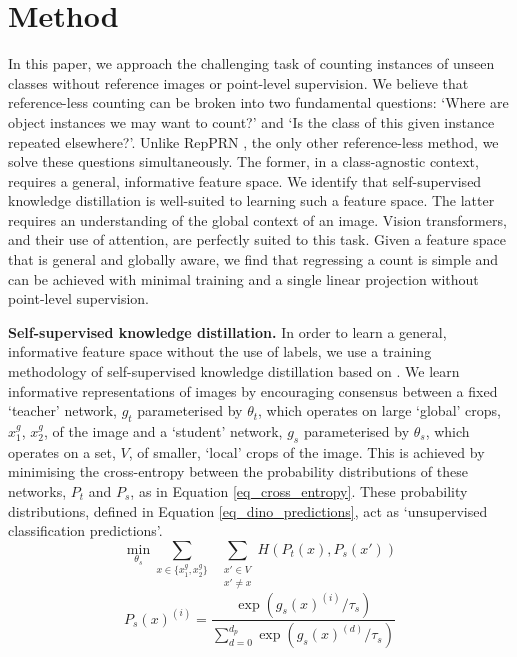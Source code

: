 \documentclass[letterpaper, 11pt]{IEEEtran}
\begin{document}
\section{Method}
\label{method}
In this paper, we approach the challenging task of counting instances of unseen classes without reference images or point-level supervision. 
We believe that reference-less counting can be broken into two fundamental questions: `Where are object instances we may want to count?' and `Is the class of this given instance repeated elsewhere?'. 
Unlike RepPRN \cite{ranjan2022exemplar}, the only other reference-less method, we solve these questions simultaneously.
The former, in a class-agnostic context, requires a general, informative feature space. We identify that self-supervised knowledge distillation is well-suited to learning such a feature space. The latter requires an understanding of the global context of an image. Vision transformers, and their use of attention, are perfectly suited to this task.
Given a feature space that is general and globally aware, we find that regressing a count is simple and can be achieved with minimal training and a single linear projection without point-level supervision.

\textbf{Self-supervised knowledge distillation.}
In order to learn a general, informative feature space without the use of labels, we use a training methodology of self-supervised knowledge distillation based on \citet{caron2021DINO}. We learn informative representations of images by encouraging consensus between a fixed `teacher' network, $g_{t}$ parameterised by $\theta_{t}$,  which operates on large `global' crops, $x_{1}^{g}$, $x_{2}^{g}$,  of the image and a `student' network, $g_{s}$ parameterised by $\theta_{s}$, which operates on a set, $V$, of smaller, `local' crops of the image.
This is achieved by minimising the cross-entropy between the probability distributions of these networks, $P_{t}$ and $P_{s}$, as in Equation \ref{eq_cross_entropy}.
These probability distributions, defined in Equation \ref{eq_dino_predictions}, act as `unsupervised classification predictions'. 
\begin{equation}
\label{eq_cross_entropy}
    \min\limits_{\theta_{s}}
    \sum_{x \in \{ x_{1}^{g}, x_{2}^{g}\}}
    \; \;
    \sum\limits_{\substack{x' \in V \\ x' \neq x}}  H(P_{t}(x), P_{s}(x'))
\end{equation}
\begin{equation}
\label{eq_dino_predictions}
    P_{s}(x)^{(i)} =
    \frac{\exp(g_{s}(x)^{(i)}/\tau_{s})}{\sum_{d=0}^{d_p}\exp(g_{s}(x)^{(d)}/\tau_{s})}
\end{equation}
\end{document}
